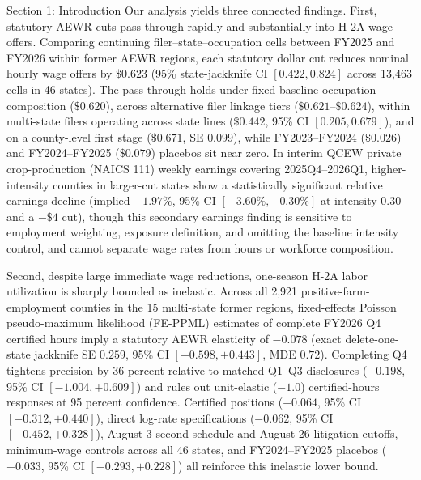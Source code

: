 \begin{llmdraft}{Section 1: Introduction}
Our analysis yields three connected findings. First, statutory AEWR cuts pass
through rapidly and substantially into H-2A wage offers. Comparing continuing
filer--state--occupation cells between FY2025 and FY2026 within former AEWR
regions, each statutory dollar cut reduces nominal hourly wage offers by
$\$0.623$ (95\% state-jackknife CI $[0.422, 0.824]$ across 13,463 cells in 46
states). The pass-through holds under fixed baseline occupation composition
($\$0.620$), across alternative filer linkage tiers ($\$0.621$--$\$0.624$),
within multi-state filers operating across state lines ($\$0.442$, 95\% CI
$[0.205, 0.679]$), and on a county-level first stage ($\$0.671$, SE $0.099$),
while FY2023--FY2024 ($\$0.026$) and FY2024--FY2025 ($\$0.079$) placebos sit
near zero. In interim QCEW private crop-production (NAICS 111) weekly earnings
covering 2025Q4--2026Q1, higher-intensity counties in larger-cut states show a
statistically significant relative earnings decline (implied $-1.97\%$, 95\% CI
$[-3.60\%, -0.30\%]$ at intensity $0.30$ and a $-\$4$ cut), though this
secondary earnings finding is sensitive to employment weighting, exposure
definition, and omitting the baseline intensity control, and cannot separate
wage rates from hours or workforce composition.

Second, despite large immediate wage reductions, one-season H-2A labor
utilization is sharply bounded as inelastic. Across all 2,921 positive-farm-employment
counties in the 15 multi-state former regions, fixed-effects Poisson
pseudo-maximum likelihood (FE-PPML) estimates of complete FY2026 Q4 certified
hours imply a statutory AEWR elasticity of $-0.078$ (exact delete-one-state
jackknife SE $0.259$, 95\% CI $[-0.598, +0.443]$, MDE $0.72$). Completing Q4
tightens precision by 36 percent relative to matched Q1--Q3 disclosures
($-0.198$, 95\% CI $[-1.004, +0.609]$) and rules out unit-elastic ($-1.0$)
certified-hours responses at 95 percent confidence. Certified positions
($+0.064$, 95\% CI $[-0.312, +0.440]$), direct log-rate specifications
($-0.062$, 95\% CI $[-0.452, +0.328]$), August 3 second-schedule and August 26
litigation cutoffs, minimum-wage controls across all 46 states, and
FY2024--FY2025 placebos ($-0.033$, 95\% CI $[-0.293, +0.228]$) all reinforce
this inelastic lower bound.


\end{llmdraft}

